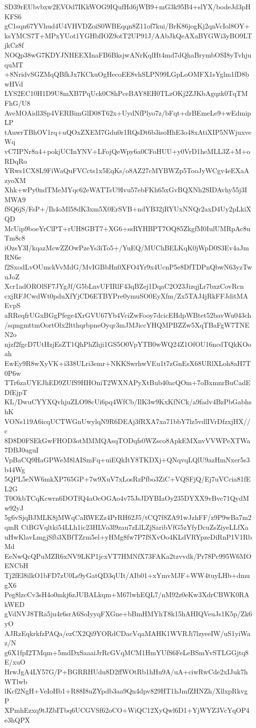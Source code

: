 SD39rEUbvbxw2EVOd7IKkWOG9IQufHd6jWB9+mG3k95B4+slYX/bodeJd3pHKFS6
gC1sqn67YVhud4U4VHVDZoiS0WBEqqn8Z11of7kui/BrK86jogKj2qnVcIol8OY+
ksYMCS7T+MPxYUot1YGHbfIOZ9otT2UP91J/AAbJkQeAXaBYGWi3yBO9LTjkCz8f
NOQp38wG7KDYJNHEEXInaFB6BksjwANrKqlHt4md7dQhaBrymbOSI8yTvhjuquMT
+8NridvSGZMqQBfkJx7KCkuOgHecoEE8vhSLPN99LGpLoOMFX1sYglm1fD8bwHVd
LYS2EC10H1D9U8mXB7PqUck0C8hPceBAY8EH0TLzOKj2ZJKbAgqzk0TqTMFhG/U8
AveMOAidl3Sp4VERBimGlD08T62x+UydNfPlyo7z/bFqt+drBEmeLe9+wEdmipLP
tAuwrTBhOV1rq+uQOxZXEM7Gdu0r1RQsDt6b3isoHhE3o48xAtiXIP5NWjuxveWq
vC7IPNr8a4+pokjUCInYNV+LFojQeWpy6a0CFoHUU+y0VrD1heMLL3Z+M+oRDqRo
YRws1CX8L9FiWaQuFVCcts1x5EqKs/o8AZ27cMYBWZp5TooJyWCgv4eEXaAzyoXM
Xhk+wPy0ndTMeMYqc62eWATTsU9Ivu57ebFKh65xGvBQXNh2SIDAvhy55j3IMWA9
fSQ6jS/FsP+/Ih4oMl58dK3xm5X0ErSVB+ndYB32jRYUxNNQr2axD4Uy2pLkiXQD
McUip9boeYrClPT+rUH8GBT7+XG6+ssRYHBPT7OQ85ZkgfM0IulUMRpAc8uTm8c8
iOzsY3I/kqazMcwZZOwPzeYs3iTo5+/YuEQ/MUChBELKqK0jWpD0S3Ev4aJmRN6e
f2SxodLvOUmckVvMdG/MvIGBbHn0XFO4Yr9x4UcnP5e8DfTDPnQbwN63yzTwuJoZ
Xcr1adOROlSF7JYgJf/G5bLnvUFIRlF43qBZej1DqaC2O23JizqjLr7bxzCovRcn
cxjRFJCwdWt0pduXfYjCD6ETBYPre0ymuSO0EyXfm/Zx5TAJ4jRkFFJditMAEvpS
aRReqfrUGxBGgPfege4XrGVU67Yb4VciZwFooy7dcicEHdpWBtet52bavWu043ch
/sqmgmttmOortOlx2ltthqrbpneOyqr3mJMJiccYHQMPBZZw5XqTBaFgW7TNEN2o
njzf2fgcD7UtHzjEsZT1QhPhZhji1GS5O0VpYTB0wWQ24Z1OfOU16ncdTQkKOoah
EwEy9R8wXyVK+i338ULri3emr+NKKSwrhwVEu1t7zGnEsX68URlXLoh8aH7T0P6w
TTr6zaUYEJhED9ZUfS9HHOniT2WXNAPyXtBub40acQOm+7oBxmnrBuCadEDfEjpT
KL/DwuCYYXQvhjuZLO98cUi6pq4WfCb/IlK3w9KxKfNCk/a9fadv4BzPbGabhshK
VONs119A6icqUCTWGnUwylqN9R6DEAj3fRXA7xa71bbY7lz5vdlIVrDfzxjHX//c
8D8D0FSEkGwFHOD3otMMMQAsqTODqfs0WZsco8ApkEMXnvVVWPeXTWa7DBJ0uguI
VpBaCQ9HaGPWeM8lAISmFq+uiEQkItY8TKDXj+QNqvqLQlU9azHmNxer5s3b44Wg
5QPL5eNW6mkXP765GP+7w9XuV7xLosRzPfbo3ZiC+VQSFjQ/Ej7uVCcia81fEL2G
T0OkbTCqKcwrn6DOTfQ4aOcOGAo4v75JsJDYBIaOy235DYXX9vBvc71QydMw92yJ
5g6vSjqBJMLK8jMWqCaRWEZz4PrRH62J5/tCQ7f8ZA91wJzhFF/z9P9wBa7m2qmR
CtBGVqltki54LLh1ic23HLVo3l9zau7zLlLZjSaribVfG5zYfyDcuZsZiyeLLfXa
uHwKlavLmgjSfb3XBfTZrm5el+yHMg8fw7P7fSXvOo4KLdVRYpzeDiRnP1V1RbMd
EeNwQcQPuMZR6xNV9LKP1jcxVT7HMNfX73FAKa2tzvvdk/Pr78Pc995W6MOENCbH
Tj2fEl8ilkO1bFD7zU0Ls9yGatQD3qUIt/AIb01+xYmvMJF+WW4tuyLHb+dmugX6
Peg8lzcCv3sH4o0mkj6zJUBALkqm+M67lwhEQL7/nM92z0eKw3XdrCBWK0RAkWED
gVdNVJ8TRa5ju4r6srA6SoIyyqFXGne+bBmHMYhT8k15hAHIQVeuJs1K5p/Zk6yO
AJRzEqkrkfzPAQa/ezCX2Qi9YORdCDacVqaMAHK1WVRJi7lzyeeIW/uS1yiWaz/N
g6X1fpI2TMqm+5mdDxSaaaiJrRcGVqMCM1HmYUfS6FeLeBSmYvSTLGGjtq8E/xuO
HrwJgA4LY57G/P+BGRRHUdu8D2ffWOtRb1hHu9A/uA+ciwRwCde2xIJuk7hWTlwb
lKcf2NgH+VeIoHb1+R88I8uZYpdb3aa9Qn4dpv829HT1hJmfZHNZh/XllxpRkvgP
XPmhEzxq9tJZbITbq6UCGVSf62oCO+WiQC12XyQwl6D1+YjWYZ3VcYqOP4e3hQPX
